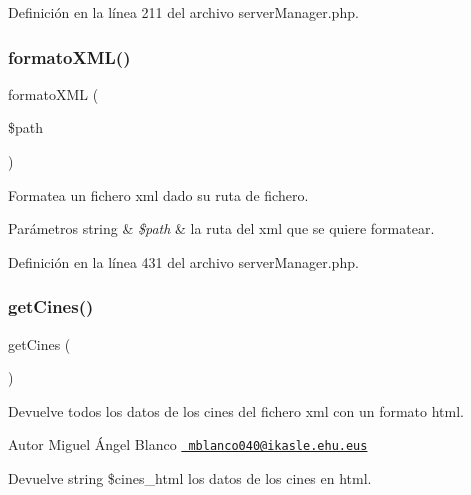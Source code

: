 Definición en la línea 211 del archivo server\+Manager.\+php.

\mbox{\label{server_manager_8php_ab4f3bf12b92f40682511b689e9844461}} 
\subsubsection{\texorpdfstring{formatoXML()}{formatoXML()}}
{\footnotesize\ttfamily formato\+X\+ML (\begin{DoxyParamCaption}\item[{}]{\$path }\end{DoxyParamCaption})}

Formatea un fichero xml dado su ruta de fichero.


\begin{DoxyParams}[1]{Parámetros}
string & {\em \$path} & la ruta del xml que se quiere formatear. \\
\hline
\end{DoxyParams}


Definición en la línea 431 del archivo server\+Manager.\+php.

\mbox{\label{server_manager_8php_ac56532a15e25498ecfc3ce334217adb2}} 
\subsubsection{\texorpdfstring{getCines()}{getCines()}}
{\footnotesize\ttfamily get\+Cines (\begin{DoxyParamCaption}{ }\end{DoxyParamCaption})}

Devuelve todos los datos de los cines del fichero xml con un formato html.

\begin{DoxyAuthor}{Autor}
Miguel Ángel Blanco \href{mailto:mblanco040@ikasle.ehu.eus}{\texttt{ mblanco040@ikasle.\+ehu.\+eus}}
\end{DoxyAuthor}
\begin{DoxyReturn}{Devuelve}
string \$cines\+\_\+html los datos de los cines en html. 
\end{DoxyReturn}


